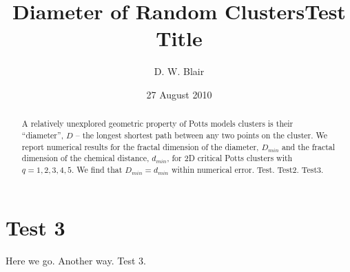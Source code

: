 \documentclass[pre,preprint]{revtex4-1}
\title{Diameter of Random Clusters}
\date{27 August 2010}
\begin{document}
\begin{abstract}
 A relatively unexplored geometric property of Potts models clusters is their ``diameter'', $D$ -- the longest shortest path between any two points on the cluster. We report numerical results for the fractal dimension of the diameter, $D_{min}$ and the fractal dimension of the chemical distance, $d_{min}$, for 2D critical Potts clusters with $q=1,2,3,4,5$. We find that $D_{min} = d_{min}$ within numerical error. Test. Test2. Test3.
\end{abstract}

\title {Test Title}
\author{D. W. Blair}
\maketitle
\section{Test 3}
\label{sec-1}

Here we go.
Another way.
Test 3.
\end{document}
